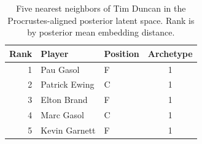 \begin{table}[htbp]
  \centering\small
  \begin{tabular}{rllc}
    \toprule
    Rank & Player & Position & Archetype \\
    \midrule
    1 & Pau Gasol & F & 1 \\
    2 & Patrick Ewing & C & 1 \\
    3 & Elton Brand & F & 1 \\
    4 & Marc Gasol & C & 1 \\
    5 & Kevin Garnett & F & 1 \\
    \bottomrule
  \end{tabular}
  \caption{Five nearest neighbors of Tim Duncan in the Procrustes-aligned posterior latent space. Rank is by posterior mean embedding distance.}
  \label{tab:Tim_Duncan_neighbors}
\end{table}

